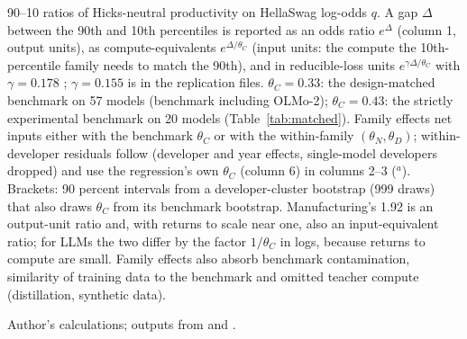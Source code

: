 \begin{table}[tp]
\begin{tablenotes}
90--10 ratios of Hicks-neutral productivity on HellaSwag log-odds $q$. A gap $\Delta$ between the 90th and 10th percentiles is reported as an odds ratio $e^{\Delta}$ (column 1, output units), as compute-equivalents $e^{\Delta/\theta_C}$ (input units: the compute the 10th-percentile family needs to match the 90th), and in reducible-loss units $e^{\gamma\Delta/\theta_C}$ with $\gamma=0.178$ \citep{besiroglu2024chinchilla}; $\gamma=0.155$ \citep{hoffmann2022training} is in the replication files. $\theta_C=0.33$: the design-matched benchmark on 57 models (benchmark including OLMo-2); $\theta_C=0.43$: the strictly experimental benchmark on 20 models (Table~\ref{tab:matched}). Family effects net inputs either with the benchmark $\theta_C$ or with the within-family $(\theta_N,\theta_D)$; within-developer residuals follow \citet{mertens2026secret} (developer and year effects, single-model developers dropped) and use the regression's own $\theta_C$ (column 6) in columns 2--3 ($^{a}$). Brackets: 90 percent intervals from a developer-cluster bootstrap (999 draws) that also draws $\theta_C$ from its benchmark bootstrap. Manufacturing's 1.92 is an output-unit ratio and, with returns to scale near one, also an input-equivalent ratio; for LLMs the two differ by the factor $1/\theta_C$ in logs, because returns to compute are small. Family effects also absorb benchmark contamination, similarity of training data to the benchmark and omitted teacher compute (distillation, synthetic data).
\end{tablenotes}
\begin{tablenotes}[Source]
Author's calculations; outputs from \citet{ruan2024observational} and \citet{maiapolo2024sloth}.
\end{tablenotes}
\end{table}
